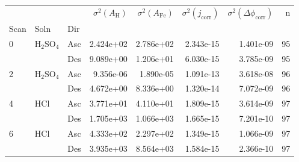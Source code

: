 \begin{tabular}{lllrrrrr}
\toprule
  &     &     &  $\sigma^2(A_{\text{H}})$ &  $\sigma^2(A_{\text{Fe}})$ &  $\sigma^2(j_{\text{corr}})$ &  $\sigma^2(\Delta \phi_{\text{corr}})$ &   n \\
Scan & Soln & Dir &                           &                            &                              &                                        &     \\
\midrule
0 & H$_2$SO$_4$ & Asc &                 2.424e+02 &                  2.786e+02 &                    2.343e-15 &                              1.401e-09 &  95 \\
  &     & Des &                 9.089e+00 &                  1.206e+01 &                    6.030e-15 &                              3.785e-09 &  95 \\
2 & H$_2$SO$_4$ & Asc &                 9.356e-06 &                  1.890e-05 &                    1.091e-13 &                              3.618e-08 &  96 \\
  &     & Des &                 4.672e+00 &                  8.336e+00 &                    1.320e-14 &                              7.072e-09 &  96 \\
4 & HCl & Asc &                 3.771e+01 &                  4.110e+01 &                    1.809e-15 &                              3.614e-09 &  97 \\
  &     & Des &                 1.705e+03 &                  1.066e+03 &                    1.665e-15 &                              7.201e-10 &  97 \\
6 & HCl & Asc &                 4.333e+02 &                  2.297e+02 &                    1.349e-15 &                              1.066e-09 &  97 \\
  &     & Des &                 3.935e+03 &                  8.564e+03 &                    1.584e-15 &                              2.366e-10 &  97 \\
\bottomrule
\end{tabular}
